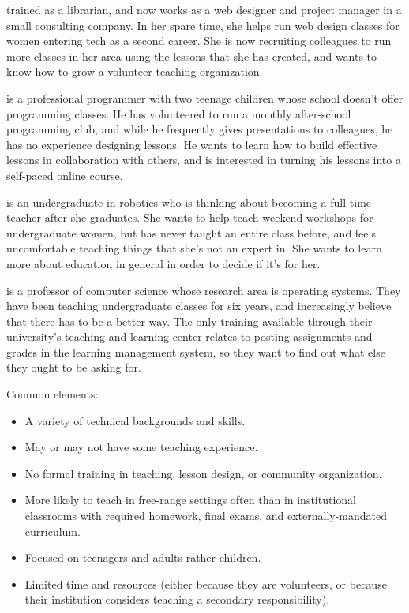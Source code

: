 \begin{description}
\tightlist
\item[Emily]
trained as a librarian, and now works as a web designer and project
manager in a small consulting company. In her spare time, she helps
run web design classes for women entering tech as a second career.
She is now recruiting colleagues to run more classes in her area
using the lessons that she has created, and wants to know how to
grow a volunteer teaching organization.
\item[Moshe]
is a professional programmer with two teenage children whose school
doesn't offer programming classes. He has volunteered to run a
monthly after-school programming club, and while he frequently gives
presentations to colleagues, he has no experience designing lessons.
He wants to learn how to build effective lessons in collaboration
with others, and is interested in turning his lessons into a
self-paced online course.
\item[Samira]
is an undergraduate in robotics who is thinking about becoming a
full-time teacher after she graduates. She wants to help teach
weekend workshops for undergraduate women, but has never taught an
entire class before, and feels uncomfortable teaching things that
she's not an expert in. She wants to learn more about education in
general in order to decide if it's for her.
\item[Gene]
is a professor of computer science whose research area is operating
systems. They have been teaching undergraduate classes for six
years, and increasingly believe that there has to be a better way.
The only training available through their university's teaching and
learning center relates to posting assignments and grades in the
learning management system, so they want to find out what else they
ought to be asking for.
\end{description}

Common elements:

\begin{itemize}
\item
  A variety of technical backgrounds and skills.
\item
  May or may not have some teaching experience.
\item
  No formal training in teaching, lesson design, or community
  organization.
\item
  More likely to teach in free-range settings often than in
  institutional classrooms with required homework, final exams, and
  externally-mandated curriculum.
\item
  Focused on teenagers and adults rather children.
\item
  Limited time and resources (either because they are volunteers, or
  because their institution considers teaching a secondary
  responsibility).
\end{itemize}

